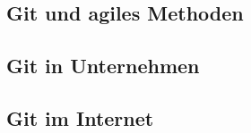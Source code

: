 \chapter{\lookout}
\label{cha:lookout}
\section{Git und agiles Methoden}
\section{Git in Unternehmen}
\section{Git im Internet}
\chapter{\result}
\label{cha:result}
